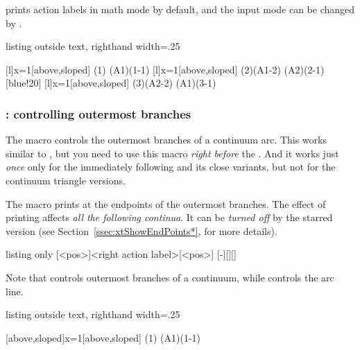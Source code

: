 \cmd{\cntmistb(*)} prints action labels in math mode by default, and the input mode can be changed by \cmd{\setistmathTF(*)}.

\begin{tcblisting}{listing outside text, righthand width=.25\linewidth}
\begin{istgame}[font=\scriptsize]
\cntmdistance*{10mm}{20mm}{3mm}
[l]{x=1}[above,sloped]
\istrootcntm(1)      \istb        \endist
\istroot(A1)(1-1)    \istb \istb  \endist
{}[l]{x=1}[above,sloped]
\istrootcntm(2)(A1-2) \istb       \endist
\istroot(A2)(2-1)     \istb \istb \endist
{}
[blue!20]
[l]{x=1}[above,sloped]
\istrootcntm(3)(A2-2) \istb       \endist
\istroot(A1)(3-1)     \istb \istb \endist
\end{istgame}
\end{tcblisting}

\subsubsection{\protect\cmd{\cntmAistb}: controlling outermost branches}

The macro \icmd{\cntmAistb} controls the outermost branches of a continuum arc.
This works similar to \cmd{\istb}, but you need to use this macro \emph{right before} the \cmd{\istrootcntmA}.
And it works just \emph{once} only for the immediately following \cmd{\istrootcntmA} and its close variants, but not for the continuum triangle versions.

The macro \icmd{\cntmAistb*} prints  at the endpoints of the outermost branches.
The effect of printing  affects \emph{all the following continua}.
It can be \emph{turned off} by the starred version \icmd{\xtHideEndPoints*} (see Section~\ref{ssec:xtShowEndPoints*}, for more details).

\begin{tcblisting}{listing only}
  [<pos>]{<right action label>}[<pos>]
  [-]{}[]{}[]
\end{tcblisting}

Note that \cmd{\cntmAistb} controls outermost branches of a continuum, while \cmd{\cntmApreset} controls the arc line.

\begin{tcblisting}{listing outside text, righthand width=.25\linewidth}
\begin{istgame}[font=\scriptsize]
\cntmdistance*{10mm}{20mm}
[above,sloped]{x=1}[above,sloped]
\istrootcntmA(1)      \istbA        \endist
\istroot(A1)(1-1)    \istbA \istbA  \endist
\end{istgame}
\end{tcblisting}


